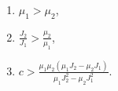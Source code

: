\begin{enumerate}
\item $\mu _1 > \mu _2$,
\item $\frac{J_2}{J_1} > \frac{\mu _2}{\mu _1}$,
\item $c >
\frac{\mu _1\mu _2(\mu _1J_2 - \mu _2J_1)}{\mu _1J^2_2 - \mu _2J^2_1}$.
\end{enumerate}
